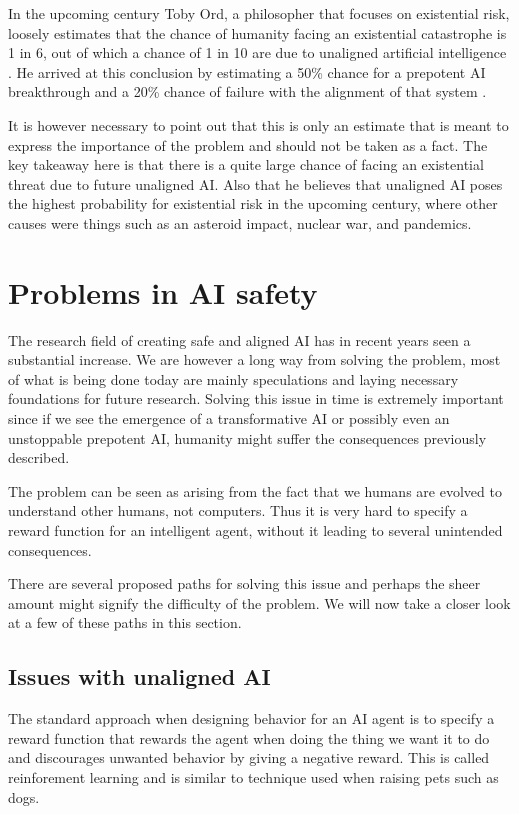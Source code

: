 \documentclass[12pt,A4]{report}
\theoremstyle{definition}
\begin{document}
In the upcoming century Toby Ord, a philosopher that focuses on existential risk, loosely estimates that the chance of humanity facing an existential catastrophe is 1 in 6, out of which a chance of 1 in 10 are due to unaligned artificial intelligence \autocite{precipice}. He arrived at this conclusion by estimating a 50\% chance for a prepotent AI breakthrough and a 20\% chance of failure with the alignment of that system \autocite{rationally speaking}.

It is however necessary to point out that this is only an estimate that is meant to express the importance of the problem and should not be taken as a fact. The key takeaway here is that there is a quite large chance of facing an existential threat due to future unaligned AI. Also that he believes that unaligned AI poses the highest probability for existential risk in the upcoming century, where other causes were things such as an asteroid impact, nuclear war, and pandemics. 



\section{Problems in AI safety}
The research field of creating safe and aligned AI has in recent years seen a substantial increase. We are however a long way from solving the problem, most of what is being done today are mainly speculations and laying necessary foundations for future research. Solving this issue in time is extremely important since if we see the emergence of a transformative AI or possibly even an unstoppable prepotent AI, humanity might suffer the consequences previously described. 

The problem can be seen as arising from the fact that we humans are evolved to understand other humans, not computers. Thus it is very hard to specify a reward function for an intelligent agent, without it leading to several unintended consequences. 

There are several proposed paths for solving this issue and perhaps the sheer amount might signify the difficulty of the problem. We will now take a closer look at a few of these paths in this section.

\subsection{Issues with unaligned AI}

The standard approach when designing behavior for an AI agent is to specify a reward function that rewards the agent when doing the thing we want it to do and discourages unwanted behavior by giving a negative reward. This is called reinforement learning and is similar to technique used when raising pets such as dogs. 
\end{document}
